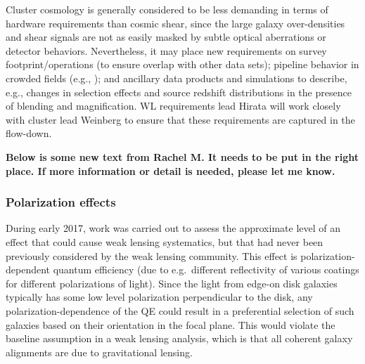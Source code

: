 Cluster cosmology is generally considered to be less demanding in terms of hardware requirements than
cosmic shear, since the large galaxy over-densities and shear signals are not as easily masked by
subtle optical aberrations or detector behaviors. Nevertheless, it may place new requirements
on survey footprint/operations (to ensure overlap with other data sets); pipeline behavior in
crowded fields (e.g., \cite{2015MNRAS.449.1259S}); and ancillary data products and simulations to describe, e.g., changes in selection
effects and source redshift distributions in the presence of blending and magnification.
WL requirements lead Hirata will work closely with cluster lead Weinberg to ensure that these
requirements are captured in the flow-down.

%
%

\textbf{Below is some new text from Rachel M.  It needs to be put in the right place.  If more
information or detail is needed, please let me know.}

\subsubsection{Polarization effects}
During early 2017, work was carried out to assess the approximate level of an effect that could
cause weak lensing systematics, but that had never been previously considered by the weak lensing
community.  This effect is polarization-dependent quantum efficiency (due to e.g.\ different
reflectivity of various coatings for different polarizations of light).  Since the light from
edge-on disk galaxies typically has some low level polarization perpendicular to the disk, any
polarization-dependence of the QE could result in a preferential selection of such galaxies based on
their orientation in the focal plane.  This would violate the baseline assumption in a weak lensing
analysis, which is that all coherent galaxy alignments are due to gravitational lensing.


